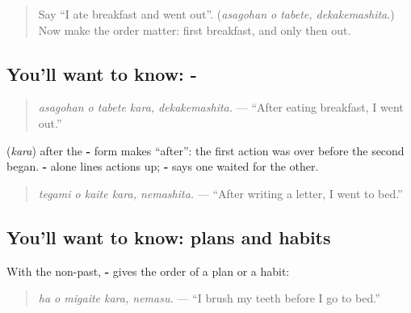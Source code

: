 \begin{quote}
Say \textquotedblleft{}I ate breakfast and went out\textquotedblright{}. (\emph{asagohan o tabete, dekakemashita}.) Now make the order matter: first breakfast, and only then out.
\end{quote}

\subsection*{You'll want to know: -}
\begin{quote}
\textbf{ }
\end{quote}

\begin{quote}
\emph{asagohan o tabete kara, dekakemashita.} — \textquotedblleft{}After eating breakfast, I went out.\textquotedblright{}
\end{quote}

\textbf{} (\emph{kara}) after the \textbf{-} form makes \textquotedblleft{}after\textquotedblright{}: the first action was over before the second began. \textbf{-} alone lines actions up; \textbf{-} says one waited for the other.

\begin{quote}
\textbf{ }
\end{quote}

\begin{quote}
\emph{tegami o kaite kara, nemashita.} — \textquotedblleft{}After writing a letter, I went to bed.\textquotedblright{}
\end{quote}

\subsection*{You'll want to know: plans and habits}
With the non-past, \textbf{-} gives the order of a plan or a habit:

\begin{quote}
\textbf{ }
\end{quote}

\begin{quote}
\emph{ha o migaite kara, nemasu.} — \textquotedblleft{}I brush my teeth before I go to bed.\textquotedblright{}
\end{quote}

\begin{quote}
\textbf{ }
\end{quote}

